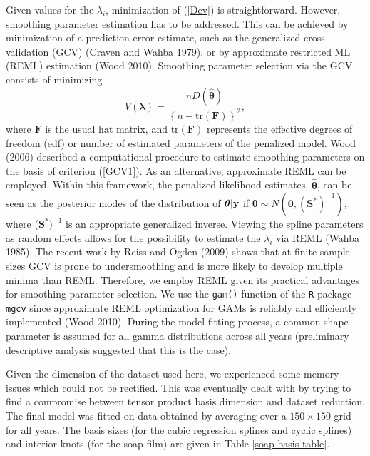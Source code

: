 \documentclass[10pt] {article}
\newcommand{\beq}{\begin{equation}}
\newcommand{\eeq}{\end{equation}}
\theoremstyle{definition}
\theoremstyle{plain}
\begin{document}
Given values for the $\lambda_i$, minimization of (\ref{Dev}) is straightforward. However, smoothing parameter estimation has to be addressed. This can be achieved by minimization of a prediction error estimate, such as the generalized cross-validation (GCV) (Craven and Wahba 1979), or by approximate restricted ML (REML) estimation (Wood 2010). Smoothing parameter selection via the GCV consists of minimizing 
\beq
V(\bm\lambda)=\frac{nD(\hat{\bm\theta})}{\left\{n-\text{tr}(\textbf{F})\right\}^2},
\label{GCV1}
\eeq
where $\textbf{F}$ is the usual hat matrix, and $\text{tr}(\textbf{F})$ represents the effective degrees of freedom (edf) or number of estimated parameters of the penalized model. Wood (2006) described a computational procedure to estimate smoothing parameters on the basis of criterion (\ref{GCV1}). As an alternative, approximate REML can be employed. Within this framework, the penalized likelihood estimates, $\hat{\bm\theta}$, can be seen as the posterior modes of the distribution of $\bm\theta|{\bf y}$ if $\bm\theta \sim N(\textbf{0},(\textbf{S}^*)^{-1})$, where ($\textbf{S}^*)^{-1}$ is an appropriate generalized inverse. Viewing the spline parameters as random effects allows for the possibility to estimate the $\lambda_i$ via REML (Wahba 1985). The recent work by Reiss and Ogden (2009) shows that at finite sample sizes GCV is prone to undersmoothing and is more likely to develop multiple minima than REML. Therefore, we employ REML given its practical advantages for smoothing parameter selection. We use the \texttt{gam()} function of the \texttt{R} package \texttt{mgcv} since approximate REML optimization for GAMs is reliably and efficiently implemented (Wood 2010). During the model fitting process, a common shape parameter is assumed for all gamma distributions across all years (preliminary descriptive analysis suggested that this is the case).

Given the dimension of the dataset used here, we experienced some memory issues which could not be rectified. This was eventually dealt with by trying to find a compromise between tensor product basis dimension and dataset reduction. The final model was fitted on data obtained by averaging over a $150\times150$ grid for all years. The basis sizes (for the cubic regression splines and cyclic splines) and interior knots (for the soap film) are given in Table \ref{soap-basis-table}.
\end{document}
